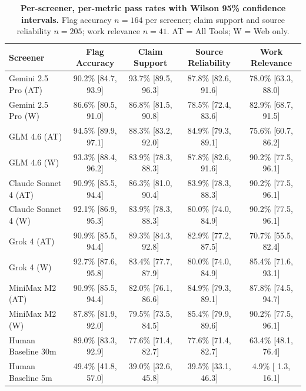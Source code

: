 \documentclass[utf8]{frontiers_suppmat}
\begin{document}
\begin{table}[H]
\centering
\caption{\textbf{Per-screener, per-metric pass rates with Wilson 95\% confidence intervals.} Flag accuracy $n = 164$ per screener; claim support and source reliability $n = 205$; work relevance $n = 41$. AT = All Tools; W = Web only.}
\label{tab:wilson_metric}
\small
\begin{tabular}{lcccc}
\toprule
\textbf{Screener} & \textbf{Flag Accuracy} & \textbf{Claim Support} & \textbf{Source Reliability} & \textbf{Work Relevance} \\
\midrule
Gemini 2.5 Pro (AT)  & 90.2\% [84.7, 93.9] & 93.7\% [89.5, 96.3] & 87.8\% [82.6, 91.6] & 78.0\% [63.3, 88.0] \\
Gemini 2.5 Pro (W)   & 86.6\% [80.5, 91.0] & 86.8\% [81.5, 90.8] & 78.5\% [72.4, 83.6] & 82.9\% [68.7, 91.5] \\
GLM 4.6 (AT)         & 94.5\% [89.9, 97.1] & 88.3\% [83.2, 92.0] & 84.9\% [79.3, 89.1] & 75.6\% [60.7, 86.2] \\
GLM 4.6 (W)          & 93.3\% [88.4, 96.2] & 83.9\% [78.3, 88.3] & 87.8\% [82.6, 91.6] & 90.2\% [77.5, 96.1] \\
Claude Sonnet 4 (AT) & 90.9\% [85.5, 94.4] & 86.3\% [81.0, 90.4] & 83.9\% [78.3, 88.3] & 90.2\% [77.5, 96.1] \\
Claude Sonnet 4 (W)  & 92.1\% [86.9, 95.3] & 83.9\% [78.3, 88.3] & 80.0\% [74.0, 84.9] & 90.2\% [77.5, 96.1] \\
Grok 4 (AT)          & 90.9\% [85.5, 94.4] & 89.3\% [84.3, 92.8] & 82.9\% [77.2, 87.5] & 70.7\% [55.5, 82.4] \\
Grok 4 (W)           & 92.7\% [87.6, 95.8] & 83.4\% [77.7, 87.9] & 80.0\% [74.0, 84.9] & 85.4\% [71.6, 93.1] \\
MiniMax M2 (AT)      & 90.9\% [85.5, 94.4] & 82.0\% [76.1, 86.6] & 84.9\% [79.3, 89.1] & 87.8\% [74.5, 94.7] \\
MiniMax M2 (W)       & 87.8\% [81.9, 92.0] & 79.5\% [73.5, 84.5] & 85.4\% [79.9, 89.6] & 90.2\% [77.5, 96.1] \\
Human Baseline 30m   & 89.0\% [83.3, 92.9] & 77.6\% [71.4, 82.7] & 77.6\% [71.4, 82.7] & 63.4\% [48.1, 76.4] \\
Human Baseline 5m    & 49.4\% [41.8, 57.0] & 39.0\% [32.6, 45.8] & 39.5\% [33.1, 46.3] &  4.9\% [ 1.3, 16.1] \\
\bottomrule
\end{tabular}
\end{table}
\end{document}
